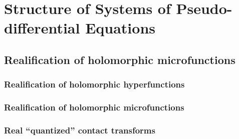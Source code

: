 \chapter{Structure of Systems of Pseudo-differential Equations}

\section{Realification of holomorphic microfunctions}

\subsection{Realification of holomorphic hyperfunctions}

\subsection{Realification of holomorphic microfunctions}

\subsection{Real ``quantized'' contact transforms}

